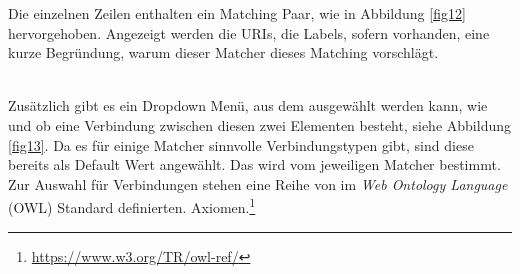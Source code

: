 		Die einzelnen Zeilen enthalten ein Matching Paar, wie in Abbildung \ref{fig12}
		hervorgehoben. Angezeigt werden die URIs, die Labels, sofern vorhanden, eine
		kurze Begründung, warum dieser Matcher dieses Matching vorschlägt.\\
		\begin{minipage}{\linewidth}
			\label{fig12}  
		\end{minipage}
		\\
		Zusätzlich gibt es ein Dropdown Menü, aus dem ausgewählt werden kann, wie und
		ob eine Verbindung zwischen diesen zwei Elementen besteht, siehe Abbildung \ref{fig13}. Da es für
		einige Matcher sinnvolle Verbindungstypen gibt, sind diese bereits als Default
		Wert angewählt. Das wird vom jeweiligen Matcher bestimmt. Zur Auswahl für
		Verbindungen stehen eine Reihe von im \textit{Web Ontology Language} (OWL)
		Standard definierten.
		Axiomen.\footnote{\url{https://www.w3.org/TR/owl-ref/}}\\
		\begin{minipage}{\linewidth}
			\label{fig13}  
		\end{minipage}
		
